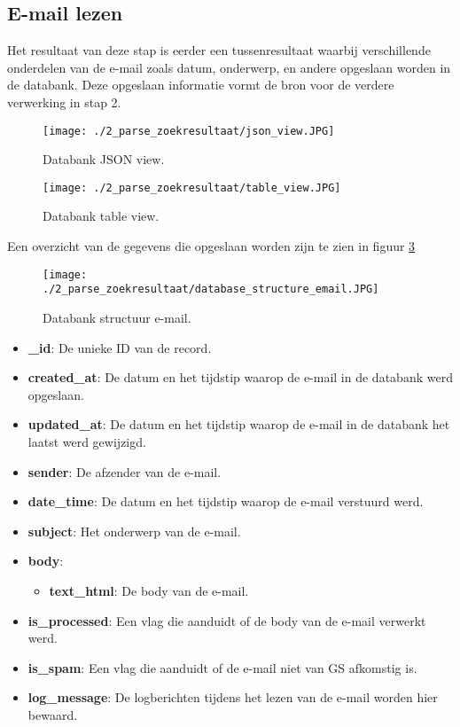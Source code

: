 \subsection{E-mail lezen}
Het resultaat van deze stap is eerder een tussenresultaat waarbij verschillende onderdelen van de e-mail zoals datum, onderwerp, en andere opgeslaan worden in de databank. Deze opgeslaan informatie vormt de bron voor de verdere verwerking in stap 2.
\begin{figure}[h!]
    \centering
    \texttt{[image: ./2\_parse\_zoekresultaat/json\_view.JPG]}
    \caption[Databank JSON view.]{\label{fig:Databank JSON view}Databank JSON view.}
\end{figure}
\begin{figure}[h!]
    \centering
    \texttt{[image: ./2\_parse\_zoekresultaat/table\_view.JPG]}
    \caption[Databank table view.]{\label{fig:Databank table view}Databank table view.}
\end{figure}
\FloatBarrier
Een overzicht van de gegevens die opgeslaan worden zijn te zien in figuur \ref{fig:databank_structuur_email}
\begin{figure}[h!]
    \centering
    \texttt{[image: ./2\_parse\_zoekresultaat/database\_structure\_email.JPG]}
    \caption[Databank structuur e-mail.]{\label{fig:databank_structuur_email}Databank structuur e-mail.}
\end{figure}
\begin{itemize}
    \item \textbf{\_id}: De unieke ID van de record.
    \item \textbf{created\_at}: De datum en het tijdstip waarop de e-mail in de databank werd opgeslaan.
    \item \textbf{updated\_at}: De datum en het tijdstip waarop de e-mail in de databank het laatst werd gewijzigd. 
    \item \textbf{sender}: De afzender van de e-mail.
    \item \textbf{date\_time}: De datum en het tijdstip waarop de e-mail verstuurd werd.
    \item \textbf{subject}: Het onderwerp van de e-mail. 
    \item \textbf{body}: 
        \begin{itemize}
            \item \textbf{text\_html}: De body van de e-mail.
        \end{itemize}
    \item \textbf{is\_processed}: Een vlag die aanduidt of de body van de e-mail verwerkt werd.
    \item \textbf{is\_spam}: Een vlag die aanduidt of de e-mail niet van GS afkomstig is. 
    \item \textbf{log\_message}: De logberichten tijdens het lezen van de e-mail worden hier bewaard. 
\end{itemize}
\FloatBarrier
